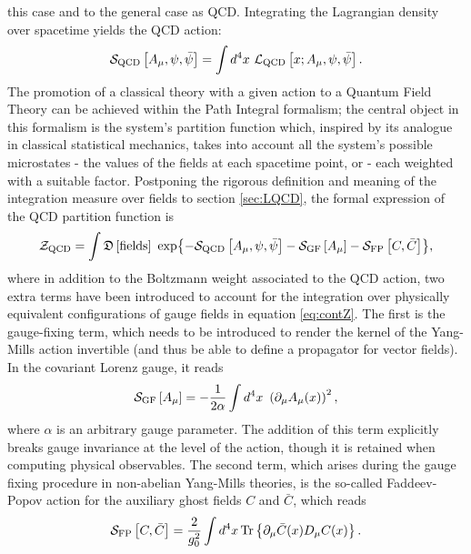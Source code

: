 this case and to the general case as QCD.
Integrating the Lagrangian density over spacetime yields the QCD action:
\begin{equation}
	\mathcal{S}_\mathrm{QCD}\left[ A_\mu,\psi,\bar{\psi} \right] = 
	\int d^4x\ \mathcal{L}_\mathrm{QCD}\left[ x; A_\mu, \psi, \bar{\psi}\right].
	\label{eq:qcd_action}
\end{equation}
The promotion of a classical theory with a given action
to a Quantum Field Theory can be achieved within the Path Integral formalism;
the central object in this formalism is the system's partition function which,
inspired by its analogue in classical statistical mechanics, takes into account
all the system's possible microstates - the values of the fields at each spacetime
point, or  - each weighted with a suitable factor. Postponing
the rigorous definition and meaning of the integration measure over fields to
section \ref{sec:LQCD},
the formal expression of the QCD partition function is
\begin{equation}
	\mathcal{Z}_\mathrm{QCD}=\int\mathfrak{D}\lsb\text{fields}\rsb\ 
\exp{-\mathcal{S}_\mathrm{QCD}\lsb A_\mu,\psi,\bar{\psi} \rsb -\mathcal{S}_\mathrm{GF}\lsb A_\mu\rsb
-\mathcal{S}_\mathrm{FP}\lsb C,\bar{C}\rsb
},\label{eq:contZ} 
\end{equation}
where in addition to the Boltzmann weight associated to the QCD action, two extra 
terms have been introduced to account for the integration over physically equivalent
configurations of gauge fields in equation \eqref{eq:contZ}. 
The first is the gauge-fixing term, which needs to be introduced to render 
the kernel of the Yang-Mills action invertible (and thus
be able to define a propagator for vector fields). In the covariant Lorenz gauge,
it reads
\begin{equation}
	\mathcal{S}_\mathrm{GF}\lsb A_\mu\rsb=-\frac{1}{2\alpha}\int d^4x\ 
\lp\partial_\mu A_\mu(x) \rp^2,\label{eq:gfact}
\end{equation}
where $\alpha$ is an arbitrary gauge parameter. The addition of this term
explicitly breaks gauge invariance at the level of the action, though it is
 retained when computing physical observables.
The second term, which arises during the gauge fixing procedure in non-abelian
Yang-Mills theories, is the so-called 
Faddeev-Popov action for the auxiliary ghost fields $C$ and $\bar{C}$, which reads
\begin{equation}
	\mathcal{S}_\mathrm{FP}\left[ C,\bar{C} \right] = \frac{2}{g_0^2}\int d^4x
\Tr\left\{\partial_\mu\bar{C}(x) D_\mu C(x)\right\}.\label{eq:fpact}
\end{equation}
